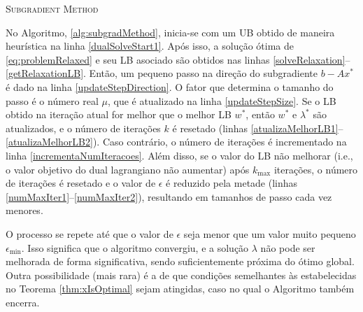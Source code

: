 {\begin{algorithm}[ht]
\DontPrintSemicolon
{}
\KwResult{$\lambda^*$}
\caption{\textsc{Subgradient Method}\label{alg:subgradMethod}}
\end{algorithm}

No Algoritmo, \ref{alg:subgradMethod}, inicia-se com um UB obtido de maneira heurística na linha \ref{dualSolveStart1}. Após isso, a solução ótima de \eqref{eq:problemRelaxed} e seu LB asociado são obtidos nas linhas \ref{solveRelaxation}--\ref{getRelaxationLB}. Então, um pequeno passo na direção do subgradiente $b - Ax^*$ é dado na linha \ref{updateStepDirection}. O fator que determina o tamanho do passo é o número real $\mu$, que é atualizado na linha \ref{updateStepSize}. Se o LB obtido na iteração atual for melhor que o melhor LB $w^*$, então $w^*$ e  $\lambda^*$ são atualizados, e o número de iterações $k$ é resetado (linhas \ref{atualizaMelhorLB1}--\ref{atualizaMelhorLB2}). Caso contrário, o número de iterações é incrementado na linha \ref{incrementaNumIteracoes}. Além disso, se o valor do LB não melhorar (i.e., o valor objetivo do dual lagrangiano não aumentar) após  $k_{\text{max}}$ iterações, o número de iterações é resetado e o valor de $\epsilon$ é reduzido pela metade (linhas \ref{numMaxIter1}--\ref{numMaxIter2}), resultando em tamanhos de passo cada vez menores. 

O processo se repete até que o valor de $\epsilon$ seja menor que um valor muito pequeno $\epsilon_{\text{min}}$. Isso significa que o algoritmo convergiu, e a solução $\lambda$ não pode ser melhorada de forma significativa, sendo suficientemente próxima do ótimo global. Outra possibilidade (mais rara) é a de que condições semelhantes às estabelecidas no Teorema \ref{thm:xIsOptimal} sejam atingidas, %
caso no qual o Algoritmo também encerra.

}

